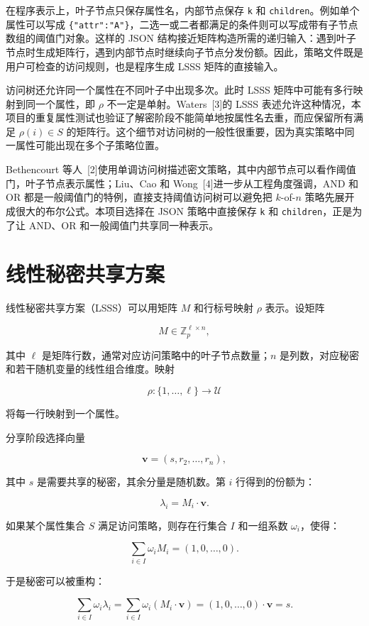 在程序表示上，叶子节点只保存属性名，内部节点保存 \verb|k| 和 \verb|children|。例如单个属性可以写成 \verb|{"attr":"A"}|，二选一或二者都满足的条件则可以写成带有子节点数组的阈值门对象。这样的 JSON 结构接近矩阵构造所需的递归输入：遇到叶子节点时生成矩阵行，遇到内部节点时继续向子节点分发份额。因此，策略文件既是用户可检查的访问规则，也是程序生成 LSSS 矩阵的直接输入。

访问树还允许同一个属性在不同叶子中出现多次。此时 LSSS 矩阵中可能有多行映射到同一个属性，即 $\rho$ 不一定是单射。Waters~[3]的 LSSS 表述允许这种情况，本项目的重复属性测试也验证了解密阶段不能简单地按属性名去重，而应保留所有满足 $\rho(i)\in S$ 的矩阵行。这个细节对访问树的一般性很重要，因为真实策略中同一属性可能出现在多个子策略位置。

Bethencourt 等人~[2]使用单调访问树描述密文策略，其中内部节点可以看作阈值门，叶子节点表示属性；Liu、Cao 和 Wong~[4]进一步从工程角度强调，AND 和 OR 都是一般阈值门的特例，直接支持阈值访问树可以避免把 $k$-of-$n$ 策略先展开成很大的布尔公式。本项目选择在 JSON 策略中直接保存 \verb|k| 和 \verb|children|，正是为了让 AND、OR 和一般阈值门共享同一种表示。

\section{线性秘密共享方案}

线性秘密共享方案（LSSS）可以用矩阵 $M$ 和行标号映射 $\rho$ 表示。设矩阵

\[
    M \in \mathbb{Z}_p^{\ell \times n},
\]

其中 $\ell$ 是矩阵行数，通常对应访问策略中的叶子节点数量；$n$ 是列数，对应秘密和若干随机变量的线性组合维度。映射

\[
    \rho:\{1,\dots,\ell\}\rightarrow \mathcal{U}
\]

将每一行映射到一个属性。

分享阶段选择向量

\[
    \mathbf{v}=(s,r_2,\dots,r_n),
\]

其中 $s$ 是需要共享的秘密，其余分量是随机数。第 $i$ 行得到的份额为：

\[
    \lambda_i=M_i\cdot \mathbf{v}.
\]

如果某个属性集合 $S$ 满足访问策略，则存在行集合 $I$ 和一组系数 $\omega_i$，使得：

\[
    \sum_{i\in I}\omega_i M_i=(1,0,\dots,0).
\]

于是秘密可以被重构：

\[
    \sum_{i\in I}\omega_i\lambda_i
    =
    \sum_{i\in I}\omega_i(M_i\cdot \mathbf{v})
    =
    (1,0,\dots,0)\cdot \mathbf{v}
    =
    s.
\]

